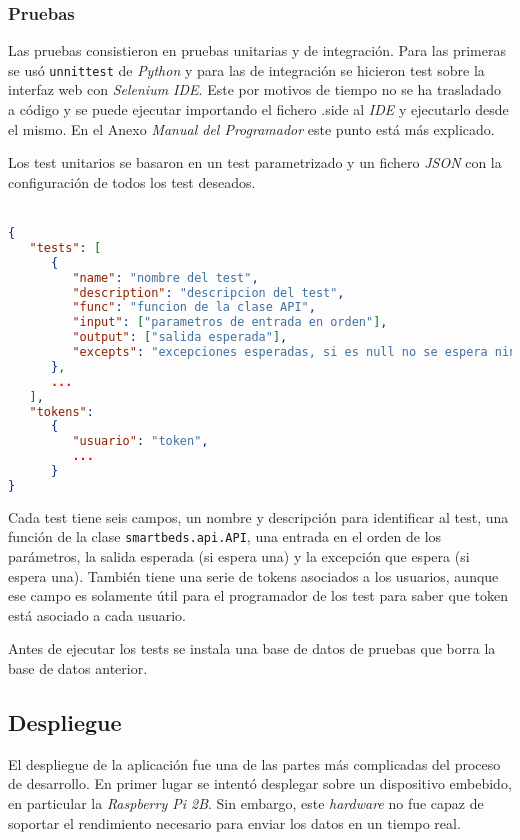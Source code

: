 \subsubsection{Pruebas}
Las pruebas consistieron en pruebas unitarias y de integración. Para las primeras se usó \texttt{unnittest} de \textit{Python} y para las de integración se hicieron test sobre la interfaz web con \textit{Selenium IDE}. Este por motivos de tiempo no se ha trasladado a código y se puede ejecutar importando el fichero .side al \textit{IDE} y ejecutarlo desde el mismo. En el Anexo \textit{Manual del Programador} este punto está más explicado.

Los test unitarios se basaron en un test parametrizado y un fichero \textit{JSON} con la configuración de todos los test deseados.
\\\\ %
\begin{lstlisting}[language=JSON]
{
   "tests": [
      {
         "name": "nombre del test",
         "description": "descripcion del test",
         "func": "funcion de la clase API",
         "input": ["parametros de entrada en orden"],
         "output": ["salida esperada"],
         "excepts": "excepciones esperadas, si es null no se espera ninguna"
      },
      ...
   ],
   "tokens": 
      {
         "usuario": "token",
         ...
      }
}
\end{lstlisting}

Cada test tiene seis campos, un nombre y descripción para identificar al test, una función de la clase \texttt{smartbeds.api.API}, una entrada en el orden de los parámetros, la salida esperada (si espera una) y la excepción que espera (si espera una). También tiene una serie de tokens asociados a los usuarios, aunque ese campo es solamente útil para el programador de los test para saber que token está asociado a cada usuario.

Antes de ejecutar los tests se instala una base de datos de pruebas que borra la base de datos anterior.

\subsection{Despliegue}
El despliegue de la aplicación fue una de las partes más complicadas del proceso de desarrollo. En primer lugar se intentó desplegar sobre un dispositivo embebido, en particular la \textit{Raspberry Pi 2B}. Sin embargo, este \textit{hardware} no fue capaz de soportar el rendimiento necesario para enviar los datos en un tiempo real.

